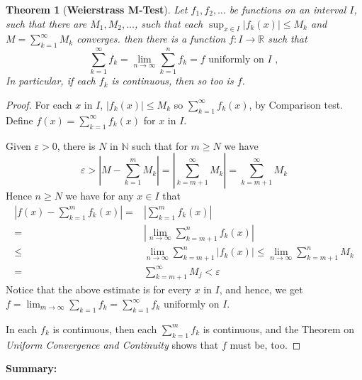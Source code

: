\documentclass[12pt]{article}
\theoremstyle{plain}
\newtheorem{theorem}{Theorem}[subsection]
\newcommand{\abs}[1]{\left| #1 \right|}
\newcommand{\mN}{{\mathbb{N}}}
\newcommand{\mR}{{\mathbb{R}}}
\newcommand{\ep}{\varepsilon}
\begin{document}
\begin{theorem}[\textbf{Weierstrass M-Test}]
	Let $f_1, f_2, \ldots $ be functions on an interval $I$, such that 
	there are $M_1, M_2, \ldots$, such that each $\sup_{x \in I} \abs{f_k(x)}
	\leq M_k$ and $M = \sum_{k = 1}^{\infty} M_k$ converges. 
	then there is a function $f: I \to \mR$ such that 
	\[
		\sum_{k=1}^{\infty} f_k = \lim_{n\to\infty} \sum_{k=1}^{n} f_k = f
		\text{ uniformly on } I \,\, ,
	\]
	In particular, if each $f_k$ is continuous, then so too is $f$. 
\end{theorem}
\begin{proof}
	For each $x$ in $I$, $\abs{f_k(x)} \leq M_k$ so $\sum_{k=1}^{\infty} f_k(x)$,
	by Comparison test. Define $f(x) = \sum_{k=1}^{\infty} f_k(x)$ for $x$ in
	$I$. 

	Given $\ep > 0$, there is $N$ in $\mN$ such that for $m\geq N$ we have
	\[
		\ep > \abs{M - \sum_{k=1}^m M_k} = \abs{\sum_{k=m+1}^{\infty} M_k}
		= \sum_{k = m+1} ^{\infty} M_k
	\]
	Hence $n \geq N$ we have for any $x \in I$ that 
	\begin{align*}
		\abs{f(x) - \sum_{k=1}^{m} f_k(x)} 
		=& \abs{\sum_{k=1}^m f_k(x)}\\
		=& \abs{\lim_{n\to\infty} \sum_{k=m+1}^n f_k(x)}\\
		\leq & \lim_{n\to\infty} \sum_{k=m+1}^n \abs{f_k(x)}
		\leq \lim_{n\to\infty} \sum_{k=m+1}^n M_k	\\
		=& \sum_{k=m+1}^{\infty} M_j < \ep
	\end{align*}
	Notice that the above estimate is for every $x$ in $I$, and hence, we get
	$f = \lim_{m\to\infty} \sum_{k=1} f_k = \sum_{k=1}^{\infty} f_k$ uniformly
	on $I$. 

	In each $f_k$ is continuous, then each $\sum_{k=1}^m f_k$ is continuous, 
	and the Theorem on \textit{Uniform Convergence and Continuity} shows that
	$f$ must be, too. 
\end{proof}

\textbf{Summary: }







\newpage
\end{document}
